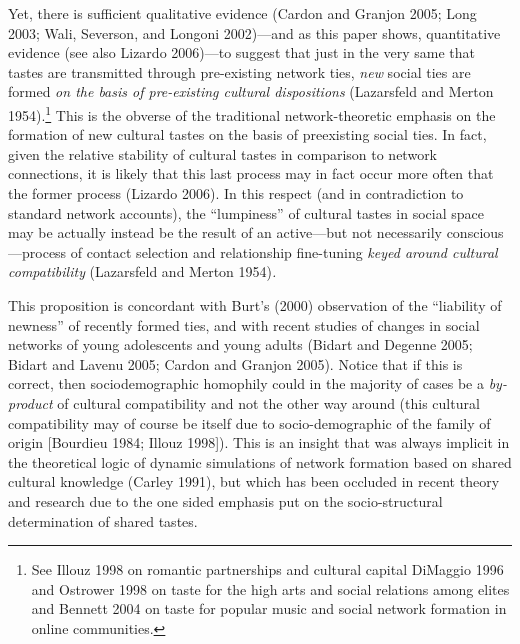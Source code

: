 \documentclass[
]{article}
\begin{document}
Yet, there is sufficient qualitative evidence (Cardon and Granjon 2005; Long 2003; Wali, Severson, and Longoni 2002)---and as this paper shows, quantitative evidence (see also Lizardo 2006)---to suggest that just in the very same that tastes are transmitted through pre-existing network ties, \emph{new} social ties are formed \emph{on the basis of pre-existing cultural dispositions} (Lazarsfeld and Merton 1954).\footnote{See Illouz 1998 on romantic partnerships and cultural capital DiMaggio 1996 and Ostrower 1998 on taste for the high arts and social relations among elites and Bennett 2004 on taste for popular music and social network formation in online communities.} This is the obverse of the traditional network-theoretic emphasis on the formation of new cultural tastes on the basis of preexisting social ties. In fact, given the relative stability of cultural tastes in comparison to network connections, it is likely that this last process may in fact occur more often that the former process (Lizardo 2006). In this respect (and in contradiction to standard network accounts), the ``lumpiness'' of cultural tastes in social space may be actually instead be the result of an active---but not necessarily conscious---process of contact selection and relationship fine-tuning \emph{keyed around cultural compatibility} (Lazarsfeld and Merton 1954)\emph{.}

This proposition is concordant with Burt's (2000) observation of the ``liability of newness'' of recently formed ties, and with recent studies of changes in social networks of young adolescents and young adults (Bidart and Degenne 2005; Bidart and Lavenu 2005; Cardon and Granjon 2005). Notice that if this is correct, then sociodemographic homophily could in the majority of cases be a \emph{by-product} of cultural compatibility and not the other way around (this cultural compatibility may of course be itself due to socio-demographic of the family of origin {[}Bourdieu 1984; Illouz 1998{]}). This is an insight that was always implicit in the theoretical logic of dynamic simulations of network formation based on shared cultural knowledge (Carley 1991), but which has been occluded in recent theory and research due to the one sided emphasis put on the socio-structural determination of shared tastes.
\end{document}

